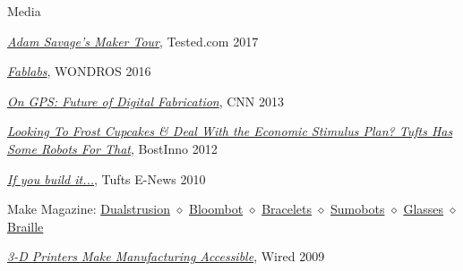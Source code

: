 \documentclass{resume} %
\begin{document}
\begin{rSection}{Media}

\href{https://www.youtube.com/watch?v=RaHMDNf56W4}{\em Adam Savage's Maker Tour}, Tested.com 2017

\href{https://vimeo.com/181328010}{\em Fablabs}, WONDROS 2016

\href{https://www.cnn.com/videos/bestoftv/2013/07/17/exp-gps-gershenfeld-3d-printing.cnn}{\em On GPS: Future of Digital Fabrication}, CNN 2013

\href{https://www.americaninno.com/boston/looking-to-frost-cupcakes-deal-with-the-economic-stimulus-plan-tufts-has-some-robots-for-that/}{\em Looking To Frost Cupcakes \& Deal With the Economic Stimulus Plan? Tufts Has Some Robots For That}, BostInno 2012

\href{https://web.archive.org/web/20120718010336/http://enews.tufts.edu/stories/1642/2010/03/31/WillLangford}{\em If you build it...}, Tufts E-News 2010


Make Magazine:
\href{https://makezine.com/2011/09/20/more-about-dualstrusion-from-makerbot/}{Dualstrusion} $\diamond$
\href{https://makezine.com/2010/04/16/hydroponic_herb_garden/}{Bloombot} $\diamond$
\href{https://makezine.com/2010/01/14/3d-printed-bracelet-of-the-future/}{Bracelets} $\diamond$
\href{https://makezine.com/2009/11/30/makerbot-sumobot/}{Sumobots} $\diamond$
\href{https://makezine.com/2009/07/14/print-your-own-glasses/}{Glasses} $\diamond$
\href{https://makezine.com/2009/09/21/printing-braille/}{Braille}

\href{https://www.wired.com/2009/08/makerbot/}{\em 3-D Printers Make Manufacturing Accessible}, Wired 2009

\end{rSection}
\end{document}
